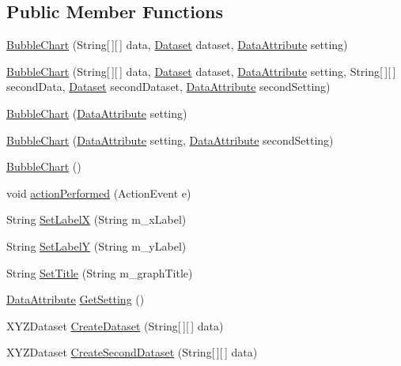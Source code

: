 \subsection*{Public Member Functions}
\begin{DoxyCompactItemize}
\item 
\hyperlink{class_bubble_chart_abde1df172d8b14212f177e1d4c866f7c}{Bubble\-Chart} (String\mbox{[}$\,$\mbox{]}\mbox{[}$\,$\mbox{]} data, \hyperlink{class_dataset}{Dataset} dataset, \hyperlink{class_data_attribute}{Data\-Attribute} setting)
\item 
\hyperlink{class_bubble_chart_afa41fb76ce19f903532f6fef230a4d94}{Bubble\-Chart} (String\mbox{[}$\,$\mbox{]}\mbox{[}$\,$\mbox{]} data, \hyperlink{class_dataset}{Dataset} dataset, \hyperlink{class_data_attribute}{Data\-Attribute} setting, String\mbox{[}$\,$\mbox{]}\mbox{[}$\,$\mbox{]} second\-Data, \hyperlink{class_dataset}{Dataset} second\-Dataset, \hyperlink{class_data_attribute}{Data\-Attribute} second\-Setting)
\item 
\hyperlink{class_bubble_chart_a6c75dda5d1a8e5596652926370ac1e0e}{Bubble\-Chart} (\hyperlink{class_data_attribute}{Data\-Attribute} setting)
\item 
\hyperlink{class_bubble_chart_a4d6417f505cc2bb349d3c3bce02d185d}{Bubble\-Chart} (\hyperlink{class_data_attribute}{Data\-Attribute} setting, \hyperlink{class_data_attribute}{Data\-Attribute} second\-Setting)
\item 
\hyperlink{class_bubble_chart_a90418fabcda19061a4d395f18ee5f48d}{Bubble\-Chart} ()
\item 
void \hyperlink{class_bubble_chart_aa0b9dd81383c38083695c6dbab56fc03}{action\-Performed} (Action\-Event e)
\item 
String \hyperlink{class_bubble_chart_a57559533fd32fd0af64c1196e7278277}{Set\-Label\-X} (String m\-\_\-x\-Label)
\item 
String \hyperlink{class_bubble_chart_a9016f31e007668efd3f8ec384e30c1d9}{Set\-Label\-Y} (String m\-\_\-y\-Label)
\item 
String \hyperlink{class_bubble_chart_a0a4eb8d3bd5c2e13229b290e06dff4c7}{Set\-Title} (String m\-\_\-graph\-Title)
\item 
\hyperlink{class_data_attribute}{Data\-Attribute} \hyperlink{class_bubble_chart_ad4ed746599c2a16959123ca77d7bea58}{Get\-Setting} ()
\item 
X\-Y\-Z\-Dataset \hyperlink{class_bubble_chart_a29cb4d22e401dd9f621501356cd1ebaf}{Create\-Dataset} (String\mbox{[}$\,$\mbox{]}\mbox{[}$\,$\mbox{]} data)
\item 
X\-Y\-Z\-Dataset \hyperlink{class_bubble_chart_a69a32c69ec1225221e9daf6488d284d3}{Create\-Second\-Dataset} (String\mbox{[}$\,$\mbox{]}\mbox{[}$\,$\mbox{]} data)
\end{DoxyCompactItemize}
